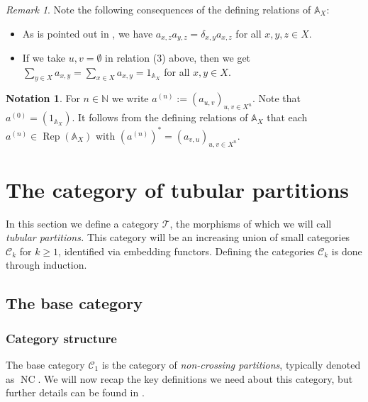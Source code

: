 \documentclass[12pt, a4paper]{amsart}
\def\NC{\operatorname{NC}}
\def\Rep{\operatorname{Rep}}
\def\A{\mathbb{A}}
\def\C{\mathbb{C}}
\def\N{\mathbb{N}}
\def\CC{\mathcal{C}}
\def\TT{\mathcal{T}}
\theoremstyle{definition}
\newtheorem{notation}[thm]{Notation}
\theoremstyle{remark}
\newtheorem{remark}[thm]{Remark}
\numberwithin{equation}{section}
\begin{document}
\begin{remark}\label{rmk:consequencefromAX}
	Note the following consequences of the defining relations of $\A_X$:
	\begin{itemize}
		\item[(i)] As is pointed out in \cite[Remarks~3.3]{BR2025}, we have $a_{x,z}a_{y,z}=\delta_{x,y}a_{x,z}$ for all $x,y,z\in X$. 
		\item[(ii)] If we take $u,v=\emptyset$ in relation (3) above, then we get $\sum_{y\in X}a_{x,y}=\sum_{x\in X}a_{x,y}=1_{\A_X}$ for all $x,y\in X$. 
	\end{itemize}
\end{remark}

\begin{notation}\label{note: a_n}
For $n\in\N$ we write $a^{(n)} := (a_{u,v})_{u,v\in X^n}$. Note that $a^{(0)}=(1_{\A_X})$. It follows from the defining relations of $\A_X$ that each $a^{(n)}\in \Rep(\A_X)$ with $(a^{(n)})^*=(a_{v,u})_{u,v\in X^n}$.  
	\end{notation}
	

\section{The category of tubular partitions} \label{sec:tubularpartitions}

In this section we define a category $\TT$, the morphisms of which we will call \emph{tubular partitions.} This category will be an increasing union of small categories $\CC_k$ for $k\geq 1$, identified via embedding functors. Defining the categories $\CC_k$ is done through induction.

\subsection{The base category}

\subsubsection{Category structure} \label{subsec:catstructure}

The base category $\CC_1$ is the category of \emph{non-crossing partitions}, typically denoted as $\NC$. We will now recap the key definitions we need about this category, but further details can be found in \cite{BS2009}.
\end{document}
